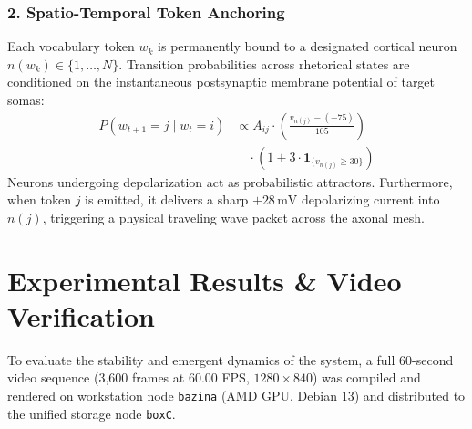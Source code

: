 \documentclass[10pt,twocolumn,a4paper]{article}
\begin{document}
\subsubsection{2. Spatio-Temporal Token Anchoring}
Each vocabulary token $w_k$ is permanently bound to a designated cortical neuron $n(w_k) \in \{1, \dots, N\}$. Transition probabilities across rhetorical states are conditioned on the instantaneous postsynaptic membrane potential of target somas:
\begin{equation}
\begin{aligned}
P(w_{t+1} = j \mid w_t = i) &\propto A_{ij} \cdot \left( \frac{v_{n(j)} - (-75)}{105} \right) \\
&\quad \cdot \left( 1 + 3 \cdot \mathbf{1}_{\{v_{n(j)} \ge 30\}} \right)
\end{aligned}
\end{equation}
Neurons undergoing depolarization act as probabilistic attractors. Furthermore, when token $j$ is emitted, it delivers a sharp $+28\,\text{mV}$ depolarizing current into $n(j)$, triggering a physical traveling wave packet across the axonal mesh.

\section{Experimental Results \& Video Verification}

To evaluate the stability and emergent dynamics of the system, a full 60-second video sequence (3,600 frames at 60.00 FPS, $1280 \times 840$) was compiled and rendered on workstation node \texttt{bazina} (AMD GPU, Debian 13) and distributed to the unified storage node \texttt{boxC}.
\end{document}
